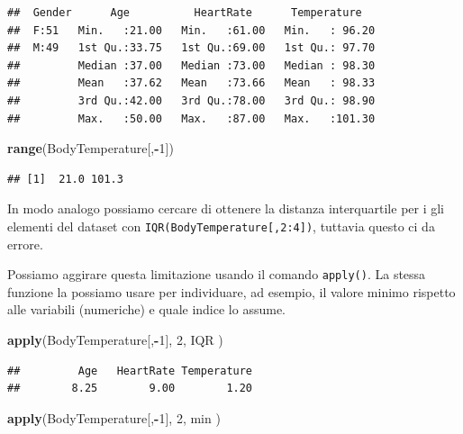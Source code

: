 \documentclass[]{book}
\newenvironment{Shaded}{\begin{snugshade}}{\end{snugshade}}
\newcommand{\DecValTok}[1]{\textcolor[rgb]{0.00,0.00,0.81}{#1}}
\newcommand{\KeywordTok}[1]{\textcolor[rgb]{0.13,0.29,0.53}{\textbf{#1}}}
\newcommand{\NormalTok}[1]{#1}
\newcommand{\OperatorTok}[1]{\textcolor[rgb]{0.81,0.36,0.00}{\textbf{#1}}}
\begin{document}
\begin{verbatim}
##  Gender      Age          HeartRate      Temperature    
##  F:51   Min.   :21.00   Min.   :61.00   Min.   : 96.20  
##  M:49   1st Qu.:33.75   1st Qu.:69.00   1st Qu.: 97.70  
##         Median :37.00   Median :73.00   Median : 98.30  
##         Mean   :37.62   Mean   :73.66   Mean   : 98.33  
##         3rd Qu.:42.00   3rd Qu.:78.00   3rd Qu.: 98.90  
##         Max.   :50.00   Max.   :87.00   Max.   :101.30
\end{verbatim}

\begin{Shaded}
\begin{Highlighting}[]
\KeywordTok{range}\NormalTok{(BodyTemperature[,}\OperatorTok{-}\DecValTok{1}\NormalTok{])}
\end{Highlighting}
\end{Shaded}

\begin{verbatim}
## [1]  21.0 101.3
\end{verbatim}

In modo analogo possiamo cercare di ottenere la distanza interquartile per i gli elementi del dataset con \texttt{IQR(BodyTemperature{[},2:4{]})}, tuttavia questo ci da errore.

Possiamo aggirare questa limitazione usando il comando \texttt{apply()}. La stessa funzione la possiamo usare per individuare, ad esempio, il valore minimo rispetto alle variabili (numeriche) e quale indice lo assume.

\begin{Shaded}
\begin{Highlighting}[]
\KeywordTok{apply}\NormalTok{(BodyTemperature[,}\OperatorTok{-}\DecValTok{1}\NormalTok{], }\DecValTok{2}\NormalTok{, IQR )}
\end{Highlighting}
\end{Shaded}

\begin{verbatim}
##         Age   HeartRate Temperature 
##        8.25        9.00        1.20
\end{verbatim}

\begin{Shaded}
\begin{Highlighting}[]
\KeywordTok{apply}\NormalTok{(BodyTemperature[,}\OperatorTok{-}\DecValTok{1}\NormalTok{], }\DecValTok{2}\NormalTok{, min )}
\end{Highlighting}
\end{Shaded}
\end{document}
